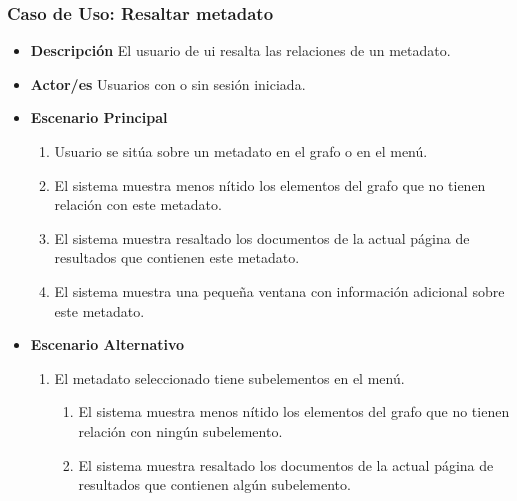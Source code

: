 \subsubsection{Caso de Uso: Resaltar \gls{metadato}}
\begin{itemize}
	\item{\textbf{Descripción}} El usuario de \gls{ui} resalta las relaciones de un \gls{metadato}.
    \item{\textbf{Actor/es}} Usuarios con o sin sesión iniciada.
    \item{\textbf{Escenario Principal}}
    	\begin{enumerate}
        	\item Usuario se sitúa sobre un \gls{metadato} en el grafo o en el menú.
			\item El sistema muestra menos nítido los elementos del grafo que no tienen relación con este \gls{metadato}.
            \item El sistema muestra resaltado los documentos de la actual página de resultados que contienen este \gls{metadato}.
            \item El sistema muestra una pequeña ventana con información adicional sobre este \gls{metadato}.
        \end{enumerate}
    \item{\textbf{Escenario Alternativo}}
    	\begin{enumerate}[label=2.\alph*]
    		\item El \gls{metadato} seleccionado tiene subelementos en el menú.
            \begin{enumerate}[label=\arabic*]
            	\item El sistema muestra menos nítido los elementos del grafo que no tienen relación con ningún subelemento.
                \item El sistema muestra resaltado los documentos de la actual página de resultados que contienen algún subelemento. 
            \end{enumerate}
        \end{enumerate}
\end{itemize}


